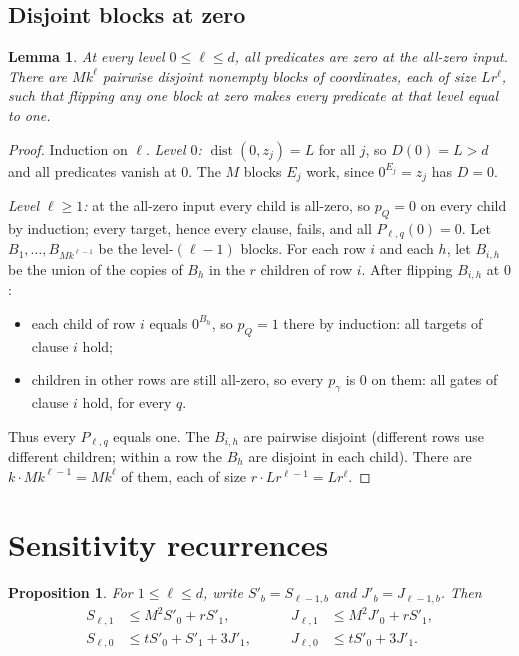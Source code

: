 \documentclass[11pt]{article}
\newtheorem{lemma}[theorem]{Lemma}
\newtheorem{proposition}[theorem]{Proposition}
\theoremstyle{definition}
\theoremstyle{remark}
\begin{document}
\subsection{Disjoint blocks at zero}
\begin{lemma}\label{lem:blocks}
At every level \(0\le\ell\le d\), all predicates are zero at the
all-zero input. There are \(Mk^\ell\) pairwise disjoint nonempty blocks
of coordinates, each of size \(Lr^\ell\), such that flipping any one
block at zero makes every predicate at that level equal to one.
\end{lemma}
\begin{proof}
Induction on $\ell$. \emph{Level $0$:}
$\operatorname{dist}(0,z_j)=L$ for all $j$, so \(D(0)=L>d\) and all
predicates vanish at $0$. The $M$ blocks \(E_j\) work, since \(0^{E_j}=z_j\)
has $D=0$.

\emph{Level $\ell\ge1$:} at the all-zero input every child is all-zero, so
$p_Q=0$ on every child by induction; every target, hence every clause, fails,
and all $P_{\ell,q}(0)=0$. Let \(B_1,\ldots,B_{Mk^{\ell-1}}\) be the
level-$(\ell-1)$ blocks. For each row \(i\) and each \(h\), let $B_{i,h}$ be
the union of the copies of \(B_h\) in the \(r\) children of row \(i\). After
flipping $B_{i,h}$ at $0$:
\begin{itemize}[leftmargin=*,itemsep=1pt]
\item each child of row $i$ equals $0^{B_h}$, so $p_Q=1$ there by induction:
 all targets of clause $i$ hold;
\item children in other rows are still all-zero, so every $p_\gamma$ is $0$
 on them: all gates of clause $i$ hold, for every $q$.
\end{itemize}
Thus every \(P_{\ell,q}\) equals one. The $B_{i,h}$ are pairwise disjoint
(different rows use different children; within a row the $B_h$ are disjoint in
each child). There are \(k\cdot Mk^{\ell-1}=Mk^\ell\) of them, each of size
\(r\cdot Lr^{\ell-1}=Lr^\ell\).
\end{proof}

\section{Sensitivity recurrences}
\label{sec:recurrences}

\begin{proposition}\label{prop:recurrences}
For $1\leq \ell\leq d$, write
$S'_b=S_{\ell-1,b}$ and $J'_b=J_{\ell-1,b}$.  Then
\begin{equation}\label{eq:recurrences}
\begin{aligned}
 S_{\ell,1}&\leq M^2S'_0+rS'_1,
 &\qquad J_{\ell,1}&\leq M^2J'_0+rS'_1,\\
 S_{\ell,0}&\leq tS'_0+S'_1+3J'_1,
 &\qquad J_{\ell,0}&\leq tS'_0+3J'_1.
\end{aligned}
\end{equation}
\end{proposition}
\end{document}
